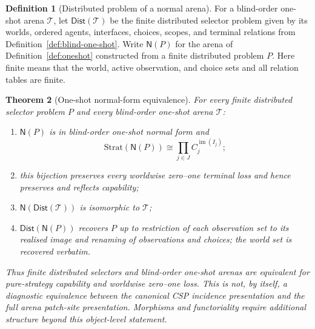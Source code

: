 \documentclass[11pt]{article}
\theoremstyle{plain}
\newtheorem{theorem}{Theorem}[section]
\theoremstyle{definition}
\newtheorem{definition}[theorem]{Definition}
\theoremstyle{remark}
\newcommand{\im}{\operatorname{im}}
\begin{document}
\begin{definition}[Distributed problem of a normal arena]
\label{def:arena-to-distributed}
For a blind-order one-shot arena $\mathcal T$, let
$\mathsf{Dist}(\mathcal T)$ be the finite distributed selector problem given by its
worlds, ordered agents, interfaces, choices, scopes, and terminal relations from
Definition~\ref{def:blind-one-shot}. Write $\mathsf N(P)$ for the arena of
Definition~\ref{def:oneshot} constructed from a finite distributed problem $P$.
Here finite means that the world, active observation, and choice sets and all
relation tables are finite.
\end{definition}

\begin{theorem}[One-shot normal-form equivalence]
\label{thm:one-shot-normal-form}
For every finite distributed selector problem $P$ and every blind-order
one-shot arena $\mathcal T$:
\begin{enumerate}[label=(\roman*)]
\item $\mathsf N(P)$ is in blind-order one-shot normal form and
\[
\mathrm{Strat}(\mathsf N(P))
\cong\prod_{j\in J}C_j^{\im(I_j)};
\]
\item this bijection preserves every worldwise zero--one terminal loss and hence
preserves and reflects capability;
\item $\mathsf N(\mathsf{Dist}(\mathcal T))$ is isomorphic to $\mathcal T$;
\item $\mathsf{Dist}(\mathsf N(P))$ recovers $P$ up to restriction of each
observation set to its realised image and renaming of observations and choices; the world set is recovered verbatim.
\end{enumerate}
Thus finite distributed selectors and blind-order one-shot arenas are equivalent
for pure-strategy capability and worldwise zero--one loss. This is not, by
itself, a diagnostic equivalence between the canonical CSP incidence
presentation and the full arena patch-site presentation. Morphisms and
functoriality require additional structure beyond this object-level statement.
\end{theorem}
\end{document}
